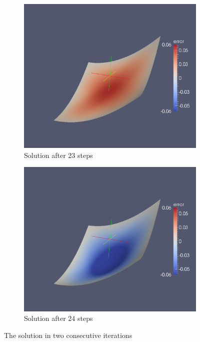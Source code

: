 \begin{figure}[!h]
\begin{subfigure}[b]{.5\textwidth}
	\includegraphics[width=1.\textwidth]{plots/with_penalty_it22.pdf}
	\caption{Solution after 23 steps}
\end{subfigure}
\begin{subfigure}[b]{.5\textwidth}
	\includegraphics[width=1.\textwidth]{plots/with_penalty_it23.pdf}
	\caption{Solution after 24 steps}
\end{subfigure}
\caption{The solution in two consecutive iterations}
\label{fig: diff iteration}
\end{figure}
